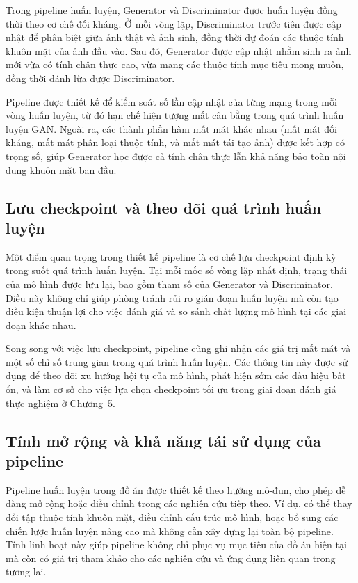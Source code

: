 \documentclass[../DoAn.tex]{subfiles}
\begin{document}
Trong pipeline huấn luyện, Generator và Discriminator được huấn luyện đồng thời theo cơ chế đối kháng. Ở mỗi vòng lặp, Discriminator trước tiên được cập nhật để phân biệt giữa ảnh thật và ảnh sinh, đồng thời dự đoán các thuộc tính khuôn mặt của ảnh đầu vào. Sau đó, Generator được cập nhật nhằm sinh ra ảnh mới vừa có tính chân thực cao, vừa mang các thuộc tính mục tiêu mong muốn, đồng thời đánh lừa được Discriminator.

Pipeline được thiết kế để kiểm soát số lần cập nhật của từng mạng trong mỗi vòng huấn luyện, từ đó hạn chế hiện tượng mất cân bằng trong quá trình huấn luyện GAN. Ngoài ra, các thành phần hàm mất mát khác nhau (mất mát đối kháng, mất mát phân loại thuộc tính, và mất mát tái tạo ảnh) được kết hợp có trọng số, giúp Generator học được cả tính chân thực lẫn khả năng bảo toàn nội dung khuôn mặt ban đầu.

\subsection{Lưu checkpoint và theo dõi quá trình huấn luyện}

Một điểm quan trọng trong thiết kế pipeline là cơ chế lưu checkpoint định kỳ trong suốt quá trình huấn luyện. Tại mỗi mốc số vòng lặp nhất định, trạng thái của mô hình được lưu lại, bao gồm tham số của Generator và Discriminator. Điều này không chỉ giúp phòng tránh rủi ro gián đoạn huấn luyện mà còn tạo điều kiện thuận lợi cho việc đánh giá và so sánh chất lượng mô hình tại các giai đoạn khác nhau.

Song song với việc lưu checkpoint, pipeline cũng ghi nhận các giá trị mất mát và một số chỉ số trung gian trong quá trình huấn luyện. Các thông tin này được sử dụng để theo dõi xu hướng hội tụ của mô hình, phát hiện sớm các dấu hiệu bất ổn, và làm cơ sở cho việc lựa chọn checkpoint tối ưu trong giai đoạn đánh giá thực nghiệm ở Chương~5.

\subsection{Tính mở rộng và khả năng tái sử dụng của pipeline}

Pipeline huấn luyện trong đồ án được thiết kế theo hướng mô-đun, cho phép dễ dàng mở rộng hoặc điều chỉnh trong các nghiên cứu tiếp theo. Ví dụ, có thể thay đổi tập thuộc tính khuôn mặt, điều chỉnh cấu trúc mô hình, hoặc bổ sung các chiến lược huấn luyện nâng cao mà không cần xây dựng lại toàn bộ pipeline. Tính linh hoạt này giúp pipeline không chỉ phục vụ mục tiêu của đồ án hiện tại mà còn có giá trị tham khảo cho các nghiên cứu và ứng dụng liên quan trong tương lai.
\end{document}
